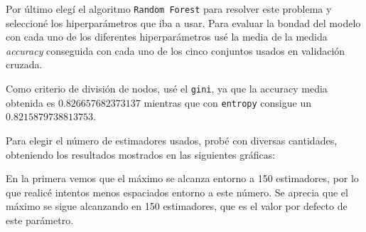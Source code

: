 \documentclass[a4]{article}
\begin{document}
Por último elegí el algoritmo \texttt{Random Forest} para resolver este problema y seleccioné los hiperparámetros que iba a usar. Para evaluar la bondad del modelo con cada uno de los diferentes hiperparámetros usé la media de la medida \textit{accuracy} conseguida con cada uno de los cinco conjuntos usados en validación cruzada.

Como criterio de división de nodos, usé el \texttt{gini}, ya que la accuracy media obtenida es $0.826657682373137$ mientras que con \texttt{entropy} consigue un $0.8215879738813753$.

Para elegir el número de estimadores usados, probé con diversas cantidades, obteniendo los resultados mostrados en las siguientes gráficas:

\begin{figure}[H]
  \centering
\end{figure}

En la primera vemos que el máximo se alcanza entorno a 150 estimadores, por lo que realicé intentos menos espaciados entorno a este número. Se aprecia que el máximo se sigue alcanzando en 150 estimadores, que es el valor por defecto de este parámetro.
\end{document}
